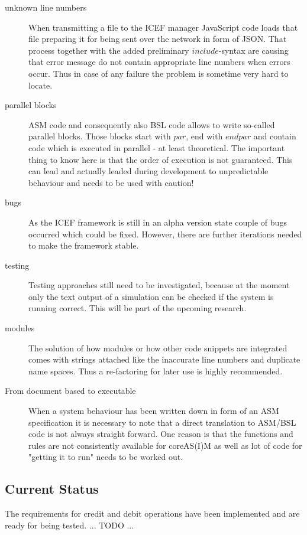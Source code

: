 \begin{description}
	\item[unknown line numbers] When transmitting a file to the ICEF manager JavaScript code loads that file preparing it for being sent over the network in form of JSON. That process together with the added preliminary $include$-syntax are causing that error message do not contain appropriate line numbers when errors occur. Thus in case of any failure the problem is sometime very hard to locate.
	\item[parallel blocks] ASM code and consequently also BSL code allows to write so-called parallel blocks. Those blocks start with $par$, end with $endpar$ and contain code which is executed in parallel - at least theoretical. The important thing to know here is that the order of execution is not guaranteed. This can lead and actually leaded during development to unpredictable behaviour and needs to be used with caution!
	\item[bugs] As the ICEF framework is still in an alpha version state couple of bugs occurred which could be fixed. However, there are further iterations needed to make the framework stable.
	\item[testing] Testing approaches still need to be investigated, because at the moment only the text output of a simulation can be checked if the system is running correct. This will be part of the upcoming research.
	\item[modules] The solution of how modules or how other code snippets are integrated comes with strings attached like the inaccurate line numbers and duplicate name spaces. Thus a re-factoring for later use is highly recommended.
	\item[From document based to executable] When a system behaviour has been written down in form of an ASM specification it is necessary to note that a direct translation to ASM/BSL code is not always straight forward. One reason is that the functions and rules are not consistently available for coreAS(I)M as well as lot of code for "getting it to run" needs to be worked out.
\end{description}

\subsection{Current Status}

The requirements for credit and debit operations have been implemented and are ready for being tested. ... TODO ...